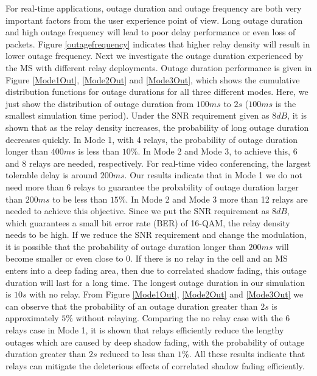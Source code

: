 \par For real-time applications, outage duration and outage frequency are both very important factors from the user experience point of view. Long outage duration and high outage frequency will lead to poor delay performance or even loss of packets. Figure \ref{outagefrequency} indicates that higher relay density will result in lower outage frequency. Next we investigate the outage duration experienced by the MS with different relay deployments. Outage duration performance is given in Figure \ref{Mode1Out}, \ref{Mode2Out} and \ref{Mode3Out}, which shows the cumulative distribution functions for outage durations for all three different modes. Here, we just show the distribution of outage duration from $100ms$ to $2s$ ($100ms$ is the smallest simulation time period). Under the SNR requirement given as $8dB$, it is shown that as the relay density increases, the probability of long outage duration decreases quickly. In Mode 1, with 4 relays, the probability of outage duration longer than $400ms$ is less than $10\%$. In Mode 2 and Mode 3, to achieve this, 6 and 8 relays are needed, respectively. For real-time video conferencing, the largest tolerable delay is around $200ms$. Our results indicate that in Mode 1 we do not need more than 6 relays to guarantee the probability of outage duration larger than $200ms$ to be less than $15\%$. In Mode 2 and Mode 3 more than 12 relays are needed to achieve this objective. Since we put the SNR requirement as $8dB$, which guarantees a small bit error rate (BER) of 16-QAM, the relay density needs to be high. If we reduce the SNR requirement and change the modulation, it is possible that the probability of outage duration longer than $200ms$ will become smaller or even close to 0. If there is no relay in the cell and an MS enters into a deep fading area, then due to correlated shadow fading, this outage duration will last for a long time. The longest outage duration in our simulation is $10s$ with no relay. From Figure \ref{Mode1Out}, \ref{Mode2Out} and \ref{Mode3Out} we can observe that the probability of an outage duration greater than $2s$ is approximately $5\%$ without relaying. Comparing the no relay case with the 6 relays case in Mode 1, it is shown that relays efficiently reduce the lengthy outages which are caused by deep shadow fading, with the probability of outage duration greater than $2s$ reduced to less than $1\%$. All these results indicate that relays can mitigate the deleterious effects of correlated shadow fading efficiently.

